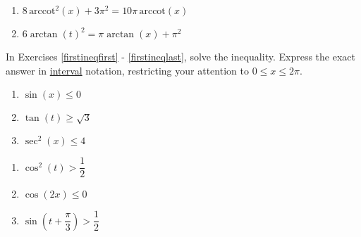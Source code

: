 \documentclass{ximera}
\begin{document}
\begin{multicols}{2}
\begin{enumerate}
\setcounter{enumi}{\value{HW}}

\item $8 \, \text{arccot}^{2}(x)+3\pi^2=10 \pi \, \text{arccot}(x)$   %
\item $6 \arctan(t)^2= \pi \arctan(x)+\pi^2$  \label{lastinveqn}  %

\setcounter{HW}{\value{enumi}}
\end{enumerate}
\end{multicols}


In Exercises \ref{firstineqfirst} - \ref{firstineqlast}, solve the inequality.  Express the exact answer in \underline{interval} notation, restricting your attention to $0 \leq x \leq 2\pi$.

\begin{multicols}{3}

\begin{enumerate}

\setcounter{enumi}{\value{HW}}

\item $\sin \left( x \right) \leq 0$ \label{firstineqfirst}
\item $\tan \left( t \right) \geq \sqrt{3}$
\item $\sec^{2} \left( x \right) \leq 4$

\setcounter{HW}{\value{enumi}}

\end{enumerate}

\end{multicols}

\begin{multicols}{3}

\begin{enumerate}

\setcounter{enumi}{\value{HW}}

\item $\cos^{2} \left( t \right) > \dfrac{1}{2}$
\item $\cos \left( 2x \right) \leq 0$ 
\item $\sin \left( t + \dfrac{\pi}{3} \right) > \dfrac{1}{2}$

\setcounter{HW}{\value{enumi}}

\end{enumerate}

\end{multicols}
\end{document}

